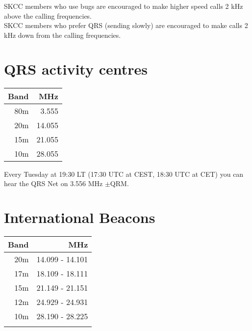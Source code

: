 \documentclass[10pt]{article}
\begin{document}
\begin{multicols}{3}
SKCC members who use bugs are encouraged to make higher speed calls 2 kHz above the calling frequencies.\\ 

SKCC members who prefer QRS (sending slowly) are encouraged to make calls 2 kHz down from the calling frequencies.

\section{QRS activity centres}
\vspace{\baselineskip}
\begin{tabular}{rr}
Band & MHz\\ \hline 
 80m & 3.555\\
 20m & 14.055\\
 15m & 21.055\\
 10m & 28.055\\
\end{tabular}
\vspace{\baselineskip}

Every Tuesday at 19:30 LT (17:30 UTC at CEST, 18:30 UTC at CET) you can hear the QRS Net on 3.556 MHz $\pm$QRM. 

\section{International Beacons}

\begin{tabular}{rr}
Band & MHz \\ \hline 
 20m & 14.099 - 14.101 \\ 
 17m & 18.109 - 18.111 \\ 
 15m & 21.149 - 21.151 \\ 
 12m & 24.929 - 24.931 \\ 
 10m & 28.190 - 28.225 \\
     &       \\     
\end{tabular}


\end{multicols}
\end{document}
